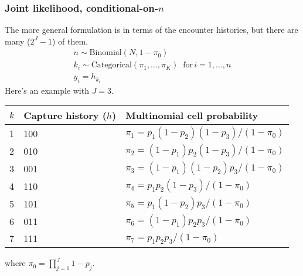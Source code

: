 \documentclass[color=usenames,dvipsnames]{beamer}\usepackage[]{graphicx}\usepackage[]{color}
\begin{document}
\begin{frame}
  \frametitle{Joint likelihood, conditional-on-$n$}
  \footnotesize
  The more general formulation is in terms of the encounter histories,
  but there are many ($2^J-1$) of them.                                  \\
  \begin{gather*}
    n \sim \mathrm{Binomial}\left(N, 1-\pi_0\right)                      \\
    k_i \sim \mathrm{Categorical}(\pi_1, \dots, \pi_K) \;\;
    \mathrm{for}\, i=1,\dots,n                                           \\
    y_i = h_{k_i}
  \end{gather*}
  \pause \vfill
  Here's an example with $J=3$.                                          \\
  \scriptsize
  \vspace{6pt}
  \centering
    \begin{tabular}{lll}
      \hline
      $k$  & Capture history ($h$) & Multinomial cell probability        \\
      \hline
      1    & 100                   & $\pi_1=p_1(1-p_2)(1-p_3)/(1-\pi_0)$ \\
      2    & 010                   & $\pi_2=(1-p_1)p_2(1-p_3)/(1-\pi_0)$ \\
      3    & 001                   & $\pi_3=(1-p_1)(1-p_2)p_3/(1-\pi_0)$ \\
      4    & 110                   & $\pi_4=p_1p_2(1-p_3)/(1-\pi_0)$     \\
      5    & 101                   & $\pi_5=p_1(1-p_2)p_3/(1-\pi_0)$     \\
      6    & 011                   & $\pi_6=(1-p_1)p_2p_3/(1-\pi_0)$     \\
      7    & 111                   & $\pi_7 = p_1p_2p_3/(1-\pi_0)$       \\
      \hline
    \end{tabular}
    \flushleft
  where $\pi_0=\prod_{j=1}^J 1-p_j$.                                     \\
\end{frame}
\end{document}
